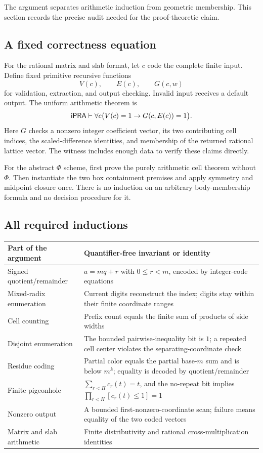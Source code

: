 The argument separates arithmetic induction from geometric
membership. This section records the precise audit needed for
the proof-theoretic claim.

\subsection{A fixed correctness equation}

For the rational matrix and slab format, let \(c\) code the
complete finite input. Define fixed primitive recursive functions
\[
                          V(c),\qquad E(c),\qquad G(c,w)
\]
for validation, extraction, and output checking. Invalid
input receives a default output. The uniform arithmetic
theorem is
\begin{equation}\label{eq:object}
 \mathsf{iPRA}\vdash\forall c\bigl(V(c)=1\to G(c,E(c))=1\bigr).
\end{equation}
Here \(G\) checks a nonzero integer coefficient vector, its
two contributing cell indices, the scaled-difference
identities, and membership of the returned rational
lattice vector. The witness includes enough data to
verify these claims directly.

For the abstract \(\Phi\) scheme, first prove the purely
arithmetic cell theorem without \(\Phi\). Then instantiate
the two box containment premises and apply symmetry and
midpoint closure once. There is no induction on an
arbitrary body-membership formula and no decision procedure
for it.

\subsection{All required inductions}

\begin{longtable}{L{.25\textwidth}L{.65\textwidth}}
\toprule
Part of the argument & Quantifier-free invariant or identity\\
\midrule
\endhead
Signed quotient/remainder&
\(a=mq+r\) with \(0\leq r<m\), encoded by integer-code equations\\
Mixed-radix enumeration&
Current digits reconstruct the index; digits stay within
their finite coordinate ranges\\
Cell counting&
Prefix count equals the finite sum of products of side widths\\
Disjoint enumeration&
The bounded pairwise-inequality bit is \(1\); a repeated
cell center violates the separating-coordinate check\\
Residue coding&
Partial color equals the partial base-\(m\) sum and is
below \(m^k\); equality is decoded by quotient/remainder\\
Finite pigeonhole&
\(\sum_{r<H}c_r(t)=t\), and the no-repeat bit implies
\(\prod_{r<H}[c_r(t)\leq1]=1\)\\
Nonzero output&
A bounded first-nonzero-coordinate scan; failure means
equality of the two coded vectors\\
Matrix and slab arithmetic&
Finite distributivity and rational cross-multiplication identities\\
\bottomrule
\end{longtable}

